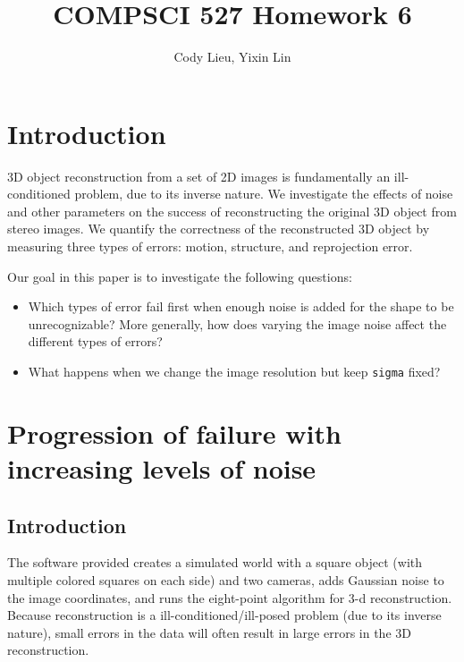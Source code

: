 \documentclass{article}
\author{Cody Lieu, Yixin Lin}
\title{COMPSCI 527 Homework 6}
\begin{document}
\maketitle

% 


\section{Introduction}

3D object reconstruction from a set of 2D images is fundamentally an ill-conditioned problem, due to its inverse nature. We investigate the effects of noise and other parameters on the success of reconstructing the original 3D object from stereo images. We quantify the correctness of the reconstructed 3D object by measuring three types of errors: motion, structure, and reprojection error.

Our goal in this paper is to investigate the following questions:
\begin{itemize}
\item Which types of error fail first when enough noise is added for the shape to be unrecognizable? More generally, how does varying the image noise affect the different types of errors?

\item What happens when we change the image resolution but keep \texttt{sigma} fixed?
\end{itemize}

\newpage
\section{Progression of failure with increasing levels of noise}

\subsection{Introduction}

The software provided creates a simulated world with a square object (with multiple colored squares on each side) and two cameras, adds Gaussian noise to the image coordinates, and runs the eight-point algorithm for 3-d reconstruction. Because reconstruction is a ill-conditioned/ill-posed problem (due to its inverse nature), small errors in the data will often result in large errors in the 3D reconstruction. 
\end{document}

